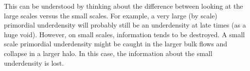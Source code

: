 This can be understood by thinking about the difference between looking at the large scales versus the small scales. For example, a very large (by scale) primordial underdensity will probably still be an underdensity at late times (as a huge void). However, on small scales, information tends to be destroyed. A small scale primordial underdensity might be caught in the larger bulk flows and collapse in a larger halo. In this case, the information about the small underdensity is lost. 




    
    



